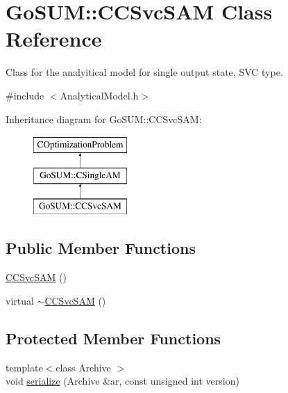\hypertarget{class_go_s_u_m_1_1_c_c_svc_s_a_m}{\section{Go\-S\-U\-M\-:\-:C\-C\-Svc\-S\-A\-M Class Reference}
\label{class_go_s_u_m_1_1_c_c_svc_s_a_m}
}


Class for the analyitical model for single output state, S\-V\-C type.  




{\ttfamily \#include $<$Analytical\-Model.\-h$>$}

Inheritance diagram for Go\-S\-U\-M\-:\-:C\-C\-Svc\-S\-A\-M\-:\begin{figure}[H]
\begin{center}
\leavevmode
\includegraphics[height=3.000000cm]{class_go_s_u_m_1_1_c_c_svc_s_a_m}
\end{center}
\end{figure}
\subsection*{Public Member Functions}
\begin{DoxyCompactItemize}
\item 
\hyperlink{class_go_s_u_m_1_1_c_c_svc_s_a_m_acfee63e083350862a3a58f87508ecb3a}{C\-C\-Svc\-S\-A\-M} ()
\item 
virtual \hyperlink{class_go_s_u_m_1_1_c_c_svc_s_a_m_a5423b6bde13300396a2d19c08d1d9a28}{$\sim$\-C\-C\-Svc\-S\-A\-M} ()
\end{DoxyCompactItemize}
\subsection*{Protected Member Functions}
\begin{DoxyCompactItemize}
\item 
{\footnotesize template$<$class Archive $>$ }\\void \hyperlink{class_go_s_u_m_1_1_c_c_svc_s_a_m_ab6aa9113e26905e5606e86d5d23c1b03}{serialize} (Archive \&ar, const unsigned int version)
\end{DoxyCompactItemize}
